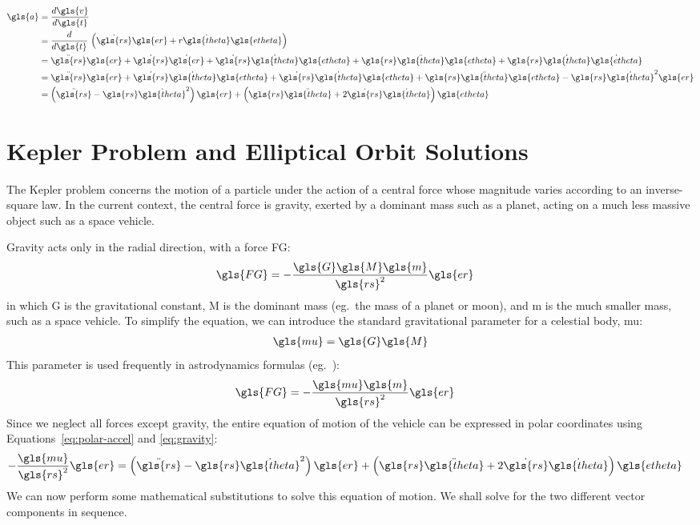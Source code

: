 \documentclass[12pt,openany]{book}
\begin{document}
\begin{align}
  \gls{a} &= \frac{d\gls{v}}{d\gls{t}} \\
  &= \frac{d}{d\gls{t}}\,\left(\dot{\gls{rs}}\gls{er} + r\dot{\gls{theta}}\gls{etheta}\right) \\
  &= \ddot{\gls{rs}}\gls{er}
     + \dot{\gls{rs}}\dot{\gls{er}}
     + \dot{\gls{rs}}\dot{\gls{theta}}\gls{etheta}
     + \gls{rs}\ddot{\gls{theta}}\gls{etheta}
     + \gls{rs}\dot{\gls{theta}}\dot{\gls{etheta}} \\
  &= \ddot{\gls{rs}}\gls{er}
     + \dot{\gls{rs}}\dot{\gls{theta}}\gls{etheta}
     + \dot{\gls{rs}}\dot{\gls{theta}}\gls{etheta}
     + \gls{rs}\ddot{\gls{theta}}\gls{etheta}
     - \gls{rs}\dot{\gls{theta}}^2\gls{er} \\
  &= \left(
     \ddot{\gls{rs}}
     - \gls{rs}\dot{\gls{theta}}^2
     \right)\gls{er}
     + \left(
     \gls{rs}\ddot{\gls{theta}}
     + 2\dot{\gls{rs}}\dot{\gls{theta}}
     \right)\gls{etheta}
     \label{eq:polar-accel}
\end{align}

\section{Kepler Problem and Elliptical Orbit Solutions}

The Kepler problem concerns the motion of a particle under the action of a central force whose magnitude varies according to an inverse-square law. In the current context, the central force is gravity, exerted by a dominant mass such as a planet, acting on a much less massive object such as a space vehicle.

Gravity acts only in the radial direction, with a force \gls{FG}:
\begin{align}
  \gls{FG} &= -\frac{\gls{G}\gls{M}\gls{m}}{\gls{rs}^2}\gls{er}
\end{align}
in which \gls{G} is the gravitational constant, \gls{M} is the dominant mass (eg.\ the mass of a planet or moon), and \gls{m} is the much smaller mass, such as a space vehicle. To simplify the equation, we can introduce the standard gravitational parameter for a celestial body, \gls{mu}:
\begin{align}
  \gls{mu} = \gls{G}\gls{M}
\end{align}
This parameter is used frequently in astrodynamics formulas (eg.~\cite{levine1971}):
\begin{align}
  \gls{FG} &= -\frac{\gls{mu}\gls{m}}{\gls{rs}^2}\gls{er}
  \label{eq:gravity}
\end{align}
Since we neglect all forces except gravity, the entire equation of motion of the vehicle can be expressed in polar coordinates using Equations~\ref{eq:polar-accel} and \ref{eq:gravity}:
\begin{align}
  -\frac{\gls{mu}}{\gls{rs}^2}\gls{er}
  &= \left(
     \ddot{\gls{rs}}
     - \gls{rs}\dot{\gls{theta}}^2
     \right)\gls{er}
     + \left(
     \gls{rs}\ddot{\gls{theta}}
     + 2\dot{\gls{rs}}\dot{\gls{theta}}
     \right)\gls{etheta}
\end{align}
We can now perform some mathematical substitutions to solve this equation of motion. We shall solve for the two different vector components in sequence.
\end{document}
